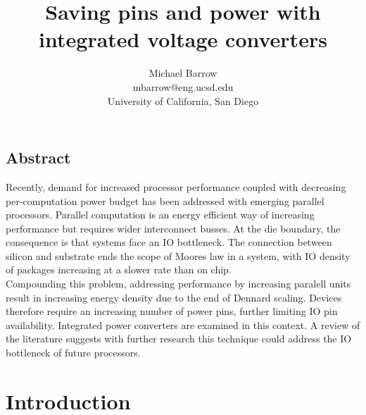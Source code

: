 \documentclass[letterpaper,twocolumn,10pt]{article}
\begin{document}
\date{}

\title{\Large \bf Saving pins and power with integrated voltage converters}

\author{
{\rm Michael Barrow}\\
mbarrow@eng.ucsd.edu\\
University of California, San Diego
}

\maketitle

\thispagestyle{empty}


\subsection*{Abstract}
Recently, demand for increased processor performance coupled with decreasing per-computation power budget has been addressed with emerging parallel processors. Parallel computation is an energy efficient way of increasing performance but requires wider interconnect busses. At the die boundary, the consequence is that systems face an IO bottleneck. The connection between silicon and substrate ends the scope of Moores law in a system, with IO density of packages increasing at a slower rate than on chip.\\
Compounding this problem, addressing performance by increasing paralell units result in increasing energy density due to the end of Dennard scaling. Devices therefore require an increasing number of power pins, further limiting IO pin availability. %
Integrated power converters are examined in this context. A review of the literature suggests with further research this technique could address the IO bottleneck of future processors.%

\section{Introduction}

\end{document}
